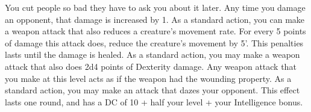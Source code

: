 \combatfeat
{You cut people so bad they have to ask you about it later.}
{Any time you damage an opponent, that damage is increased by 1.}
{As a standard action, you can make a weapon attack that also reduces a creature's movement rate. For every 5 points of damage this attack does, reduce the creature's movement by 5'. This penalties lasts until the damage is healed.}
{As a standard action, you may make a weapon attack that also does 2d4 points of Dexterity damage.}
{Any weapon attack that you make at this level acts as if the weapon had the wounding property.}
{As a standard action, you may make an attack that dazes your opponent. This effect lasts one round, and has a DC of 10 + half your level + your Intelligence bonus.}